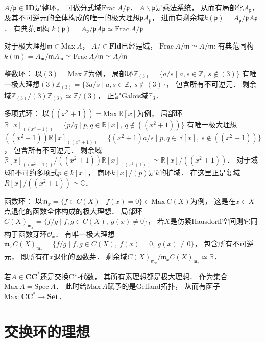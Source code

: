 $A/\mathfrak p\in\textbf{ID}$是整环，
可做分式域$\text{Frac} \ A/\mathfrak p$．
$A\smallsetminus \mathfrak p$是乘法系统，
从而有局部化$A_\mathfrak p$，
及其不可逆元的全体构成的唯一的极大理想$\mathfrak pA_\mathfrak p$，
进而有剩余域$k(\mathfrak p) = A_\mathfrak p/\mathfrak pA\mathfrak p$．
有典范同构
$k(\mathfrak p) = A_\mathfrak p/\mathfrak pA\mathfrak p
\simeq
\text{Frac} \ A/\mathfrak p$

对于极大理想$\mathfrak m\in\text{Max} \ A$，
$A/\mathfrak \in \textbf{Fld}$已经是域，
$\text{Frac} \ A/\mathfrak m \simeq A/\mathfrak m$:
有典范同构
$k(\mathfrak m) = A_\mathfrak m/\mathfrak m A_\mathfrak m \simeq \text{Frac} \ A/\mathfrak m \simeq A/\mathfrak m$

整数环：
以$(3) = \text{Max} \ \mathbb Z$为例，
局部环$\mathbb Z_{(3)} = \{a/s \mid a,s\in\mathbb Z,\ s \notin (3)\}$
有唯一极大理想$(3)\mathbb Z_{(3)} = \{3a/s \mid a,s\in\mathbb Z,\ s \notin (3)\}$，
包含所有不可逆元．
剩余域$\mathbb Z_{(3)}/(3)\mathbb Z_{(3)} \simeq \mathbb Z/(3)$，
正是Galois域$\mathbb F_3$．

多项式环：
以$((x^2 + 1)) = \text{Max} \ \mathbb R[x]$为例，
局部环$\mathbb R[x]_{((x^2 + 1))} = \{p/q \mid p,q\in\mathbb R[x],\ q \notin ((x^2 + 1))\}$
有唯一极大理想$((x^2 + 1))\mathbb R[x]_{((x^2 + 1))} = \{(x^2 + 1)a/s \mid p,q\in\mathbb R[x],\ s \notin ((x^2 + 1))\}$，
包含所有不可逆元．
剩余域$\mathbb R[x]_{((x^2 + 1))}/((x^2 + 1))\mathbb R[x]_{((x^2 + 1))} \simeq \mathbb R[x]/((x^2 + 1))$．
对于域$k$和不可约多项式$p \in k[x]$，
商环$k[x]/(p)$是$k$的扩域．
在这里正是复域$R[x]/((x^2 + 1)) \simeq \mathbb C$．

函数环：
以$\mathfrak m_x = \{f\in C(X) \mid f(x) = 0\} \in \text{Max} \ C(X)$为例，
这是在$x \in X$点退化的函数全体构成的极大理想．
局部环$C(X)_{\mathfrak m_x} = \{f/g \mid f,g\in C(X),\ g(x) \neq 0 \}$，
若$X$是仿紧Hausdorff空间则它同构于函数芽环$\mathcal O_x$．
有唯一极大理想$\mathfrak m_x C(X)_{\mathfrak m_x} = \{f/g \mid f,g\in C(X),\ f(x) = 0,\ g(x) \neq 0 \}$，
包含所有不可逆元，
即所有在$x$退化的函数芽．
剩余域$C(X)_{\mathfrak m_x}/\mathfrak m_x C(X)_{\mathfrak m_x} \simeq \mathbb R$．

若$A\in\textbf{CC}^*$还是交换C*-代数，
其所有素理想都是极大理想．
作为集合
$\text{Max} \ A = \text{Spec} \ A$．
此时给$\text{Max} \ A$赋予的是Gelfand拓扑，
从而有函子$\text{Max}: \textbf{CC}^* \to \textbf{Set}$．

\section{交换环的理想}


